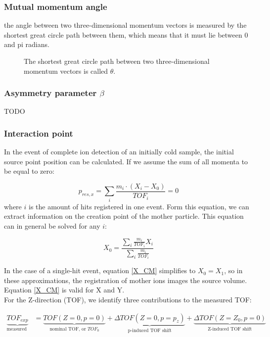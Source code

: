 \subsubsection{Mutual momentum angle}
the angle between two three-dimensional momentum vectors is measured by the shortest great circle path between them, which means that it must lie between 0 and pi radians.

\begin{figure}[H]
  \centering
  \vspace{0 cm}
  \def\svgwidth{200pt}
  \centerline{}
  \caption{The shortest great circle path between two three-dimensional momentum vectors is called $\theta$.}
\end{figure}

\subsubsection{Asymmetry parameter $\beta$}
TODO

\subsubsection{Interaction point}
In the event of complete ion detection of an initially cold sample, the initial source point position can be calculated. If we assume the sum of all momenta to be equal to zero:

\begin{equation}
p_{res, x} = \sum_i {\frac{m_i \cdot (X_i - X_{0})}{TOF_i}} = 0
\end{equation}
where $i$ is the amount of hits registered in one event. Form this equation, we can extract information on the creation point of the mother particle. This equation can in general be solved for any $i$:

\begin{equation}
X_0 = \frac{ \sum_i {\tfrac{m_i}{TOF_i} X_i} }
						{ \sum_i {\tfrac{m_i}{TOF_i} } }
\label{X_CM}
\end{equation}

In the case of a single-hit event, equation \ref{X_CM} simplifies to $X_0 = X_1$, so in these approximations, the registration of mother ions images the source volume. Equation \ref{X_CM} is valid for X and Y. \\
For the Z-direction (TOF), we identify three contributions to the measured TOF:

\begin{align}
\underbrace{TOF_{exp}} _\textrm{measured TOF} &= 
\underbrace{TOF  (Z = 0, p = 0)}_\textrm{nominal TOF, or $TOF_0$} + 
\underbrace{\Delta TOF (Z = 0, p = p_z)}_\textrm{p-induced TOF shift} +
\underbrace{\Delta TOF (Z = Z_0, p = 0)}_\textrm{Z-induced TOF shift}
\end{align}

